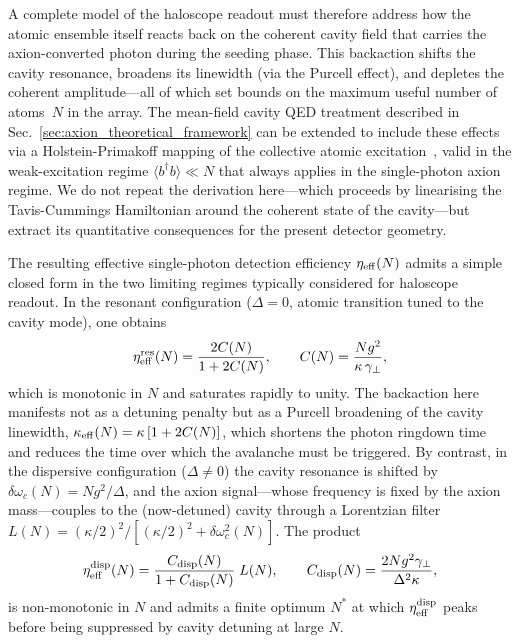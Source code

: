 A complete model of the haloscope readout must therefore address how the atomic ensemble itself reacts back on the coherent cavity field that carries the axion-converted photon during the seeding phase. This backaction shifts the cavity resonance, broadens its linewidth (via the Purcell effect), and depletes the coherent amplitude---all of which set bounds on the maximum useful number of atoms~$N$ in the array. The mean-field cavity QED treatment described in Sec.~\ref{sec:axion_theoretical_framework} can be extended to include these effects via a Holstein-Primakoff mapping of the collective atomic excitation~\cite{Hammerer2010}, valid in the weak-excitation regime $\langle b^\dagger b \rangle \ll N$ that always applies in the single-photon axion regime. We do not repeat the derivation here---which proceeds by linearising the Tavis-Cummings Hamiltonian around the coherent state of the cavity---but extract its quantitative consequences for the present detector geometry.

The resulting effective single-photon detection efficiency $\eta_{\rm eff}(N)$ admits a simple closed form in the two limiting regimes typically considered for haloscope readout. In the resonant configuration ($\Delta = 0$, atomic transition tuned to the cavity mode), one obtains
\begin{equation}
    \eta_{\rm eff}^{\rm res}(N) = \frac{2C(N)}{1 + 2C(N)}, \qquad
    C(N) = \frac{N g^2}{\kappa\,\gamma_\perp},
    \label{eq:eta_eff_resonant}
\end{equation}
which is monotonic in $N$ and saturates rapidly to unity. The backaction here manifests not as a detuning penalty but as a Purcell broadening of the cavity linewidth, $\kappa_{\rm eff}(N) = \kappa\,[1 + 2C(N)]$, which shortens the photon ringdown time and reduces the time over which the avalanche must be triggered. By contrast, in the dispersive configuration ($\Delta \neq 0$) the cavity resonance is shifted by $\delta\omega_c(N) = N g^2/\Delta$, and the axion signal---whose frequency is fixed by the axion mass---couples to the (now-detuned) cavity through a Lorentzian filter $L(N) = (\kappa/2)^2/[(\kappa/2)^2 + \delta\omega_c^2(N)]$. The product
\begin{equation}
    \eta_{\rm eff}^{\rm disp}(N) = \frac{C_{\rm disp}(N)}{1 + C_{\rm disp}(N)}\;L(N),
    \qquad C_{\rm disp}(N) = \frac{2 N g^2 \gamma_\perp}{\Delta^2 \kappa},
    \label{eq:eta_eff_dispersive}
\end{equation}
is non-monotonic in $N$ and admits a finite optimum $N^*$ at which $\eta_{\rm eff}^{\rm disp}$ peaks before being suppressed by cavity detuning at large $N$.


